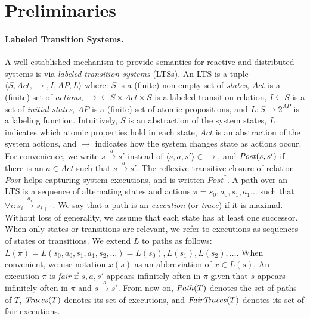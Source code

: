\section{Preliminaries} 
\label{sec:background}


\paragraph{Labeled Transition Systems.}

A well-established mechanism to provide semantics for reactive and distributed systems is via \emph{labeled transition systems} (LTSs). An LTS  is a tuple $\langle S, \textit{Act}, \rightarrow, I, \textit{AP}, L \rangle$ where: $S$ is a (finite) non-empty set of \emph{states}, $\textit{Act}$ is a (finite) set of \emph{actions}, $\rightarrow \subseteq S \times \textit{Act} \times S$ is a labeled transition relation, $I \subseteq S$ is a set of \emph{initial states}, $\textit{AP}$ is a (finite) set of atomic propositions, and $L:S \rightarrow 2^{\textit{AP}}$ is a labeling function. Intuitively, $S$ is an abstraction of the system states, $L$ indicates which atomic properties hold in each state, $\textit{Act}$ is an abstraction of the system actions, and $\rightarrow$ indicates how the system changes state as actions occur. For convenience, we write $s \xrightarrow{a} s'$ instead of $\langle s,a,s'\rangle \in \rightarrow$, and  $\mathit{Post}(s,s')$ if there is an $a \in \textit{Act}$ such that $s \xrightarrow{a} s'$. The reflexive-transitive closure of relation $\mathit{Post}$ helps capturing system executions, and is written $\mathit{Post}^*$.  A path over an LTS is a sequence of alternating states and actions $\pi=s_0, a_0,s_1, a_1 \dots$ such that $\forall i: s_i \xrightarrow{a_i} s_{i+1}$. We say that a path is an \emph{execution} (or \emph{trace}) if it is maximal. Without loss of generality, we assume that each state has at least one successor. When only states or transitions are relevant, we refer to executions as sequences of states or transitions. We extend $L$ to paths as follows: $L(\pi) = L(s_0, a_0,s_1, a_1,s_2, \dots) = L(s_0),L(s_1),L(s_2),\dots$. When convenient, we use notation $x(s)$ as an abbreviation of  $x \in L(s)$. An execution $\pi$ is \emph{fair} if $s,a,s'$ appears infinitely often in $\pi$ given that $s$ appears infinitely often in $\pi$ and $s \xrightarrow{a} s'$. From now on, $\mathit{Path}(T)$ denotes  the set of paths of $T$, $\mathit{Traces}(T)$ denotes its set of executions, and $\mathit{FairTraces}(T)$ denotes  its set of fair executions.

